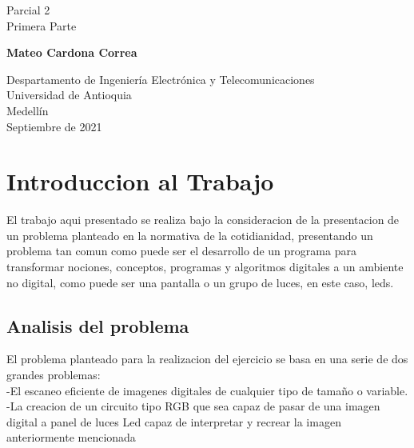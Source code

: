 \documentclass{article}
\begin{document}
\begin{titlepage}
    \begin{center}
        \vspace*{1cm}
            
        \Huge
        \textbf{}
            
        \vspace{0.5cm}
        \LARGE
        Parcial 2
        \\
        Primera Parte
            
        \vspace{1.5cm}
            
        \textbf{Mateo Cardona Correa}
            
        \vfill
            
        \vspace{0.8cm}
            
        \Large
        Despartamento de Ingeniería Electrónica y Telecomunicaciones\\
        Universidad de Antioquia\\
        Medellín\\
        Septiembre de 2021
            
    \end{center}
\end{titlepage}

\tableofcontents
\newpage
\section{Introduccion al Trabajo}\label{intro}
El trabajo aqui presentado se realiza bajo la consideracion de la presentacion de un problema planteado en la normativa de la cotidianidad, presentando un problema tan comun como puede ser el desarrollo de un programa para transformar nociones, conceptos, programas y algoritmos digitales a un ambiente no digital, como puede ser una pantalla o un grupo de luces, en este caso, leds.

\subsection{Analisis del problema}\label{}
El problema planteado para la realizacion del ejercicio se basa en una serie de dos grandes problemas: \\
-El escaneo eficiente de imagenes digitales de cualquier tipo de tamaño o variable. \\
-La creacion de un circuito tipo RGB que sea capaz de pasar de una imagen digital a panel de luces Led capaz de interpretar y recrear la imagen anteriormente mencionada
\end{document}
